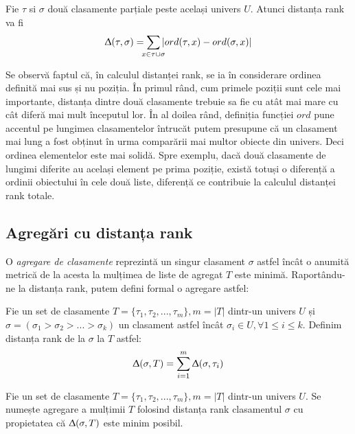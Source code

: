 \begin{definition}
Fie $\tau$ si $\sigma$ două clasamente parțiale peste același univers $U$. Atunci distanța rank va fi
\[
  \Updelta(\tau, \sigma) = \smashoperator{\sum_{x \in \tau \cup \sigma}} |ord(\tau, x) - ord(\sigma, x)|
\]
\end{definition}

Se observă faptul că, în calculul distanței rank, se ia în considerare ordinea definită mai sus
și nu poziția. În primul rând, cum primele poziții sunt cele mai importante, distanța dintre două
clasamente trebuie sa fie cu atât mai mare cu cât diferă mai mult începutul lor\cite{linguisticstructuresmarcus}.
În al doilea rând, definiția funcției $ord$ pune accentul pe lungimea clasamentelor întrucăt putem
presupune că un clasament mai lung a fost obținut în urma comparării mai multor obiecte din univers.
Deci ordinea elementelor este mai solidă. Spre exemplu, dacă două clasamente de lungimi diferite au
același element pe prima poziție, există totuși o diferență a ordinii obiectului în cele două liste,
diferență ce contribuie la calculul distanței rank totale.\cite{rankaggregationproblem}

\subsection{Agregări cu distanța rank}
O \textit{agregare de clasamente} reprezintă un singur clasament $\sigma$ astfel încât o anumită 
metrică de la acesta la mulțimea de liste de agregat $T$ este minimă. Raportându-ne la distanța rank,
putem defini formal o agregare astfel:

\begin{definition}
Fie un set de clasamente $T = \{\tau_1, \tau_2, ..., \tau_m\}, m = |T|$ dintr-un univers $U$ și
$\sigma = (\sigma_1 > \sigma_2 > ... > \sigma_k) $ un clasament astfel încât $\sigma_i \in U, 
\forall 1 \leqslant i \leqslant k$. Definim distanța rank de la $\sigma$ la $T$ astfel:
\[
  \Updelta(\sigma, T) = \smashoperator{\sum_{i = 1}^{m}} \Updelta(\sigma, \tau_i)
\]
\end{definition}

\begin{definition}
Fie un set de clasamente $T = \{\tau_1, \tau_2, ..., \tau_m\}, m = |T|$ dintr-un univers $U$. Se
numește agregare a mulțimii $T$ folosind distanța rank clasamentul $\sigma$ cu propietatea că 
$\Updelta(\sigma, T)$ este minim posibil.
\end{definition}

